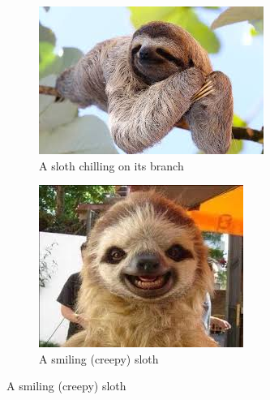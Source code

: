 \documentclass[a4paper,12pt,final]{article}
\begin{document}
	
	\begin{figure}
		\centering
		\begin{subfigure}{0.45\textwidth}
			\includegraphics[width=\textwidth]{sloth}
			\caption{A sloth chilling on its branch}
		\end{subfigure}
		\hfill
		\begin{subfigure}{0.45\textwidth}
			\includegraphics[width=\textwidth]{baby}
			\caption{A smiling (creepy) sloth}
		\end{subfigure}
		

\end{figure}
\end{document}
